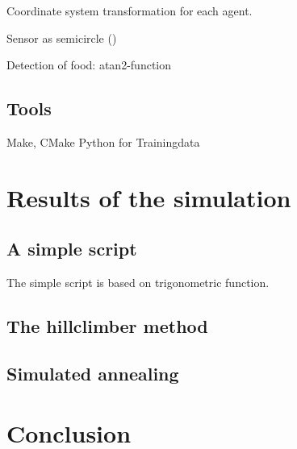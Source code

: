 \documentclass[10pt,a4paper,DIV=11]{scrreprt}
\begin{document}
Coordinate system transformation for each agent.

Sensor as semicircle (\cite{iforce})

Detection of food: atan2-function

\section{Tools}
Make, CMake
Python for Trainingdata



\chapter{Results of the simulation}

\section{A simple script}
The simple script is based on trigonometric function.

\section{The hillclimber method}

\section{Simulated annealing}



\chapter{Conclusion}





\newpage


\listoffigures
\listoftables
\listofalgorithms
\lstlistoflistings

\newpage











\end{document}
